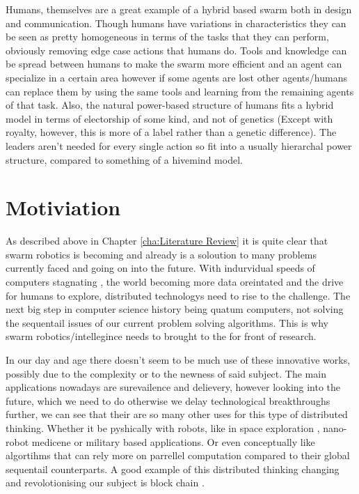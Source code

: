 \documentclass{UoYCSproject}
\begin{document}
Humans, themselves are a great example of a hybrid based swarm both in design and communication.
Though humans have variations in characteristics they can be seen as pretty homogeneous in terms of the tasks that they can perform, obviously removing edge case actions that humans do.
Tools and knowledge can be spread between humans to make the swarm more efficient and an agent can specialize in a certain area however if some agents are lost other agents/humans can replace them by using the same tools and learning from the remaining agents of that task.
Also, the natural power-based structure of humans fits a hybrid model in terms of electorship of some kind, and not of genetics (Except with royalty, however, this is more of a label rather than a genetic difference). 
The leaders aren't needed for every single action so fit into a usually hierarchal power structure, compared to something of a hivemind model.


\chapter{Motiviation}
\label{cha:Motivation}

As described above in Chapter \ref{cha:Literature Review} it is quite clear that swarm robotics is becoming and already is a soloution to many problems currently faced and going on into the future.
With indurvidual speeds of computers stagnating \cite{CPU speed}, the world becoming more data oreintated and the drive for humans to explore, distributed technologys need to rise to the challenge.
The next big step in computer science history being quatum computers, not solving the sequentail issues of our current problem solving algorithms.
This is why swarm robotics/intellegince needs to brought to the for front of research.

In our day and age there doesn't seem to be much use of these innovative works, possibly due to the complexity or to the newness of said subject.
The main applications nowadays are surevailence \cite{UAV, HiveMind} and delievery, however looking into the future, which we need to do otherwise we delay technological breakthroughs further, we can see that their are so many other uses for this type of distributed thinking.
Whether it be pyshically with robots, like in space exploration \cite{Space exploration}, nano-robot medicene or military based applications.
Or even conceptually like algortihms that can rely more on parrellel computation compared to their global sequentail counterparts.
A good example of this distributed thinking changing and revolotionising our subject is block chain \cite{blockchainandSwarm}.
\end{document}
